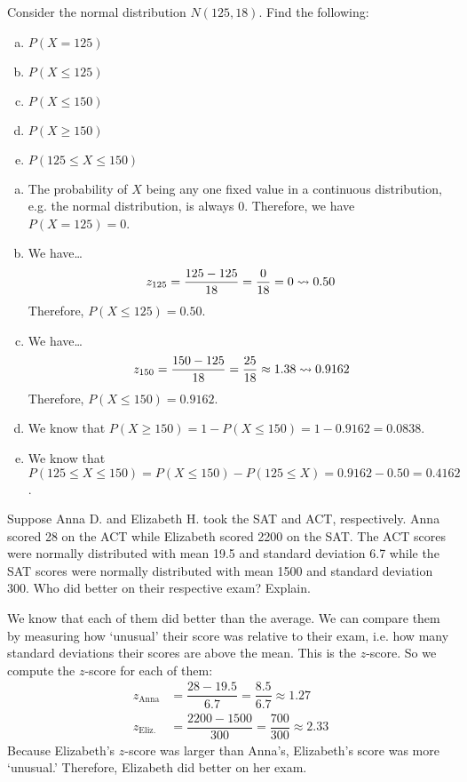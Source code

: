 \documentclass[11pt,letterpaper]{article}
\begin{document}

 Consider the normal distribution $N(125, 18)$. Find the following:
	\begin{enumerate}[(a)]
	\item $P(X= 125)$
	\item $P(X \leq 125)$
	\item $P(X \leq 150)$
	\item $P(X \geq 150)$
	\item $P(125 \leq X \leq 150)$
	\end{enumerate} \pspace

\sol 
\begin{enumerate}[(a)]
\item The probability of $X$ being any one fixed value in a continuous distribution, e.g. the normal distribution, is always 0. Therefore, we have $P(X= 125)= 0$. \pspace

\item We have\dots
	\[
	z_{125}= \dfrac{125 - 125}{18}= \dfrac{0}{18}= 0 \rightsquigarrow 0.50
	\]
Therefore, $P(X \leq 125)= 0.50$. \pspace

\item We have\dots
	\[
	z_{150}= \dfrac{150 - 125}{18}= \dfrac{25}{18} \approx 1.38 \rightsquigarrow 0.9162
	\]
Therefore, $P(X \leq 150)= 0.9162$. \pspace

\item We know that $P(X \geq 150)= 1 - P(X \leq 150)= 1 - 0.9162= 0.0838$. \pspace

\item We know that $P(125 \leq X \leq 150)= P(X \leq 150) - P(125 \leq X)= 0.9162 - 0.50= 0.4162$. 
\end{enumerate}



\newpage



 Suppose Anna D. and Elizabeth H. took the SAT and ACT, respectively. Anna scored 28 on the ACT while Elizabeth scored 2200 on the SAT. The ACT scores were normally distributed with mean 19.5 and standard deviation 6.7 while the SAT scores were normally distributed with mean 1500 and standard deviation 300. Who did better on their respective exam? Explain. \pspace

\sol We know that each of them did better than the average. We can compare them by measuring how `unusual' their score was relative to their exam, i.e. how many standard deviations their scores are above the mean. This is the $z$-score. So we compute the $z$-score for each of them:
	\[
	\begin{aligned}
	z_{\text{Anna}}&= \dfrac{28 - 19.5}{6.7}= \dfrac{8.5}{6.7} \approx 1.27 \\[0.3cm]
	z_{\text{Eliz.}}&= \dfrac{2200 - 1500}{300}= \dfrac{700}{300} \approx 2.33
	\end{aligned}
	\]
Because Elizabeth's $z$-score was larger than Anna's, Elizabeth's score was more `unusual.' Therefore, Elizabeth did better on her exam. 
\end{document}
